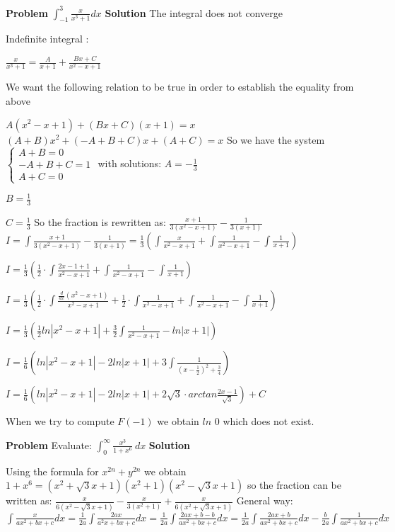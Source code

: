 \documentclass{article}
\begin{document}
{ \textbf{Problem}
 \newline
 $\int_{-1}^{3} {\frac{x}{x^{3}+1}}dx $
 \newline \newline
 \textbf{Solution}
 \newline \newline
 The integral does not converge

Indefinite integral :

$\frac{x}{x^3+1}=\frac{A}{x+1} +\frac{Bx+C}{x^2-x+1}$

We want the following relation to be true in order to establish the equality from above

$A(x^2-x+1)+(Bx+C)(x+1)=x$
$(A+B)x^2+(-A+B+C)x+(A+C)=x$
So we have the system
$\begin{cases} A+B=0 \\ -A+B+C=1 \\ A+C=0 \end{cases}$
with solutions:
$A=-\frac{1}{3} $  
    
$B=\frac{1}{3}$   

$C=\frac{1}{3}$
So the fraction is rewritten as:
$\frac{x+1}{3(x^2-x+1)}-\frac{1}{3(x+1)}$
$I=\int\frac{x+1}{3(x^2-x+1)}-\frac{1}{3(x+1)}=\frac{1}{3}\left(\int\frac{x}{x^2-x+1}+\int\frac{1}{x^2-x+1}-\int\frac{1}{x+1}\right)$

$I=\frac{1}{3}\left(\frac{1}{2}\cdot\int\frac{2x-1+1}{x^2-x+1}+\int\frac{1}{x^2-x+1}-\int\frac{1}{x+1}\right)$

$I=\frac{1}{3}\left(\frac{1}{2}\cdot\int\frac{\frac{d}{dx}(x^2-x+1)}{x^2-x+1}+\frac{1}{2}\cdot\int\frac{1}{x^2-x+1}+\int\frac{1}{x^2-x+1}-\int\frac{1}{x+1}\right)$

$I=\frac{1}{3}\left(\frac{1}{2}ln|x^2-x+1|+\frac{3}{2}\int\frac{1}{x^2-x+1}-ln|x+1|\right)$

$I=\frac{1}{6}\left(ln|x^2-x+1|-2ln|x+1|+3\int\frac{1}{\left(x-\frac{1}{2}\right)^2+\frac{3}{4}}\right)$

$I=\frac{1}{6}\left(ln|x^2-x+1|-2ln|x+1|+2\sqrt{3}\cdot arctan\frac{2x-1}{\sqrt{3}}\right)+C$

When we try to compute $F(-1)$ we obtain $ln$  ${0}$ which does not exist.

 \newpage
 
 \textbf{Problem}
 \newline \newline
 Evaluate: $\int_{0}^{\infty} \frac{x^{3}}{1 + x^{6}}\ dx$
 \newline \newline
\textbf{Solution}
\newline \newline
\begin{spacing}{\baselinestretch}
Using the formula for $x^{2n}+y^{2n}$ we obtain $1+x^6=(x^2+\sqrt3 x+1)(x^2+1)(x^2-\sqrt3 x+1)$
so the fraction can be written as:
$\frac{x}{6(x^2-\sqrt3 x+1)}-\frac{x}{3(x^2+1)}+\frac{x}{6(x^2+\sqrt 3 x+1)}$
 \newline \newline
 General way: $\int\frac{x}{ax^2+bx+c}dx=\frac{1}{2a}\int\frac{2ax}{a^2x+bx+c}dx=\frac{1}{2a}\int\frac{2ax+b-b}{ax^2+bx+c}dx=\frac{1}{2a}\int\frac{2ax+b}{ax^2+bx+c}dx-\frac{b}{2a}\int\frac{1}{ax^2+bx+c}dx$


\end{spacing}}
\end{document}
